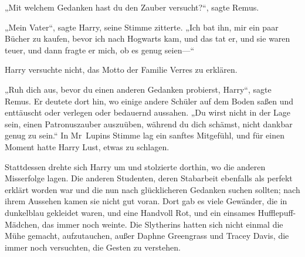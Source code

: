 „Mit welchem Gedanken hast du den Zauber versucht?“, sagte Remus.

„Mein Vater“, sagte Harry, seine Stimme zitterte. „Ich bat ihn, mir ein paar Bücher zu kaufen, bevor ich nach Hogwarts kam, und das tat er, und sie waren teuer, und dann fragte er mich, ob es genug seien—“

Harry versuchte nicht, das Motto der Familie Verres zu erklären.

„Ruh dich aus, bevor du einen anderen Gedanken probierst, Harry“, sagte Remus. Er deutete dort hin, wo einige andere Schüler auf dem Boden saßen und enttäuscht oder verlegen oder bedauernd aussahen. „Du wirst nicht in der Lage sein, einen Patronuszauber auszuüben, während du dich schämst, nicht dankbar genug zu sein.“ In Mr~Lupins Stimme lag ein sanftes Mitgefühl, und für einen Moment hatte Harry Lust, etwas zu schlagen.

Stattdessen drehte sich Harry um und stolzierte dorthin, wo die anderen Misserfolge lagen. Die anderen Studenten, deren Stabarbeit ebenfalls als perfekt erklärt worden war und die nun nach glücklicheren Gedanken suchen sollten; nach ihrem Aussehen kamen sie nicht gut voran. Dort gab es viele Gewänder, die in dunkelblau gekleidet waren, und eine Handvoll Rot, und ein einsames Hufflepuff-Mädchen, das immer noch weinte. Die Slytherins hatten sich nicht einmal die Mühe gemacht, aufzutauchen, außer Daphne Greengrass und Tracey Davis, die immer noch versuchten, die Gesten zu verstehen.

